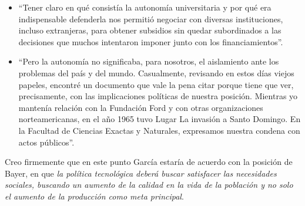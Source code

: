 \begin{itemize}
    \item ``Tener claro en qué consistía la autonomía universitaria y por qué era indispensable defenderla nos permitió negociar con diversas instituciones, incluso extranjeras, para obtener subsidios sin quedar subordinados a las decisiones que muchos intentaron imponer junto con los financiamientos''.
    \item ``Pero la autonomía no significaba, para nosotros, el aislamiento ante los problemas del país y del mundo. Casualmente, revisando en estos días viejos papeles, encontré un documento que vale la pena citar porque tiene que ver, precisamente, con las implicaciones políticas de nuestra posición. Mientras yo mantenía relación con la Fundación Ford y con otras organizaciones norteamericanas, en el año 1965 tuvo Lugar La invasión a Santo Domingo. En la Facultad de Ciencias Exactas y Naturales, expresamos nuestra condena con actos públicos''.
\end{itemize}

Creo firmemente que en este punto García estaría de acuerdo con la posición de Bayer, en que \textit{la política tecnológica deberá buscar satisfacer las necesidades sociales, buscando un aumento de la calidad en la vida de la población y no solo el aumento de la producción como meta principal}.



